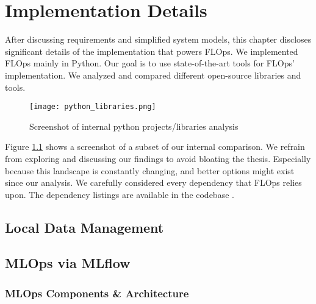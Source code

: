 \chapter{Implementation Details}

After discussing requirements and simplified system models, this chapter discloses significant details of the implementation that powers FLOps.
We implemented FLOps mainly in Python.
Our goal is to use state-of-the-art tools for FLOps' implementation.
We analyzed and compared different open-source libraries and tools.

\begin{figure}[h]
    \begin{adjustwidth}{-0.175\paperwidth}{-0.175\paperwidth}
        \centering
        \texttt{[image: python\_libraries.png]}
        \caption{Screenshot of internal python projects/libraries analysis}
        \label{fig:python_projects_libraries}
    \end{adjustwidth}
\end{figure}

Figure \ref{fig:python_projects_libraries} shows a screenshot of a subset of our internal comparison.
We refrain from exploring and discussing our findings to avoid bloating the thesis.
Especially because this landscape is constantly changing, and better options might exist since our analysis. 
We carefully considered every dependency that FLOps relies upon.
The dependency listings are available in the codebase \cite{flops_code}.





\section{Local Data Management}

\section{MLOps via MLflow}

    \subsection{MLOps Components \& Architecture}

